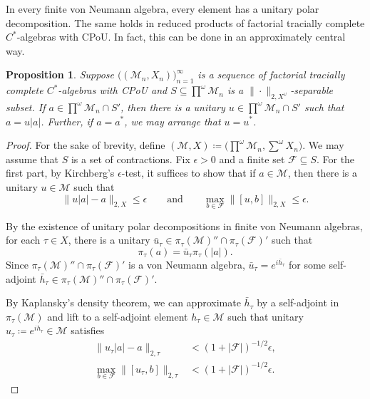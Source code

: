 \documentclass[a4paper,11pt]{amsart}
\newtheorem{proposition}[theorem]{Proposition}
\theoremstyle{definition}
\numberwithin{equation}{section}
\numberwithin{theorem}{section}
\newcommand{\M}{\mathcal{M}}
\begin{document}
In every finite von Neumann algebra, every element has a unitary polar decomposition.  The same holds in reduced products of factorial tracially complete $C^*$-algebras with CPoU.  In fact, this can be done in an approximately central way. 

\begin{proposition}\label{prop:polar-decomposition}
	Suppose $\big((\M_n, X_n)\big)_{n=1}^\infty$ is a sequence of factorial tracially complete $C^*$-algebras with CPoU and $S \subseteq \prod^\omega \M_n$ is a $\|\cdot\|_{2, X^\omega}$-separable subset.  If $a \in \prod^\omega \M_n \cap S'$, then there is a unitary $u \in \prod^\omega\M_n\cap S'$ such that $a = u|a|$.  Further, if $a = a^*$, we may arrange that $u = u^*$.
\end{proposition}

\begin{proof}
	For the sake of brevity, define $(\M, X) \coloneqq \big(\prod^\omega \M_n, \sum^\omega X_n\big)$.
	We may assume that $S$ is a set of contractions.  Fix $\epsilon > 0$ and a finite set $\mathcal F \subseteq S$.  For the first part, by Kirchberg's $\epsilon$-test, it suffices to show that if $a \in \M$, then there is a unitary  $u \in \M$ such that
	\begin{equation}\label{eqn:polar-docomp-target}
		\|u|a|-a\|_{2, X} \leq \epsilon\qquad \text{and}\qquad \max_{b \in \mathcal F}\|[u, b]\|_{2, X} \leq \epsilon.
	\end{equation}
	
	By the existence of unitary polar decompositions in finite von Neumann algebras, for each $\tau \in X$, there is a unitary $\bar u_\tau \in \pi_\tau(\M)'' \cap \pi_\tau(\mathcal F)'$ such that
	\begin{equation}\label{eq:polar-decomp-1}
		\pi_\tau(a) = \bar u_\tau\pi_\tau(|a|).
	\end{equation}
	Since $\pi_\tau(\M)'' \cap \pi_\tau(\mathcal F)'$ is a von Neumann algebra, $\bar{u}_\tau = e^{i\bar{h}_\tau}$ for some self-adjoint $\bar{h}_\tau \in \pi_\tau(\M)'' \cap \pi_\tau(\mathcal F)'$. 
	
	By Kaplansky's density theorem, we can approximate $\bar{h}_\tau$ by a self-adjoint in $\pi_\tau(\M)$ and lift to a self-adjoint element $h_\tau \in \M$ such that unitary $u_\tau \coloneqq e^{ih_\tau} \in \M$ satisfies
	\begin{equation}\begin{split}
		\| u_\tau|a|-a  \|_{2, \tau} &< (1+|\mathcal F|)^{-1/2} \epsilon, \\
		\max_{b \in \mathcal F} \|[u_\tau, b]\|_{2, \tau} &<  (1+|\mathcal F|)^{-1/2} \epsilon. \label{eq:polar-decomp-2}
	\end{split}\end{equation}
	

\end{proof}
\end{document}
